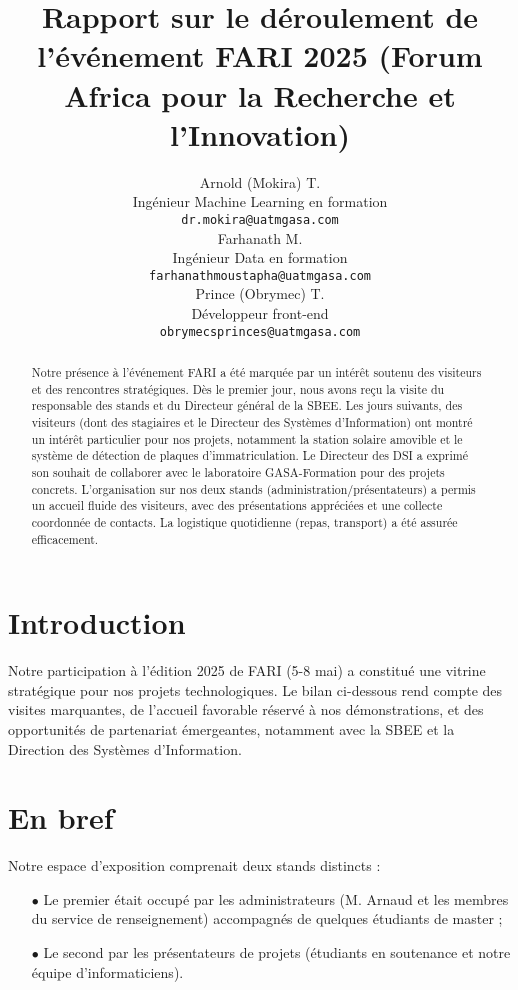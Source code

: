 \documentclass[12pt, a4paper]{article}
\title{Rapport sur le déroulement de l'événement FARI 2025 (Forum Africa pour la Recherche et l'Innovation)}
\author{
 Arnold (Mokira) T. \\
 Ingénieur Machine Learning en formation \\
  \texttt{dr.mokira@uatmgasa.com} \\
   \And
 Farhanath M. \\
 Ingénieur Data en formation \\
  \texttt{farhanathmoustapha@uatmgasa.com} \\
  \And
 Prince (Obrymec) T. \\
 Développeur front-end \\
  \texttt{obrymecsprinces@uatmgasa.com} \\
}
\begin{document}
\maketitle
\begin{abstract}
Notre présence à l'événement FARI a été marquée par un intérêt soutenu des visiteurs et des rencontres stratégiques. Dès le premier jour, nous avons reçu la visite du responsable des stands et du Directeur général de la SBEE. Les jours suivants, des visiteurs (dont des stagiaires et le Directeur des Systèmes d'Information) ont montré un intérêt particulier pour nos projets, notamment la station solaire amovible et le système de détection de plaques d'immatriculation. Le Directeur des DSI a exprimé son souhait de collaborer avec le laboratoire GASA-Formation pour des projets concrets. L'organisation sur nos deux stands (administration/présentateurs) a permis un accueil fluide des visiteurs, avec des présentations appréciées et une collecte coordonnée de contacts. La logistique quotidienne (repas, transport) a été assurée efficacement.
\end{abstract}




\section{Introduction}
Notre participation à l'édition 2025 de FARI (5-8 mai) a constitué une vitrine stratégique pour nos projets technologiques. Le bilan ci-dessous rend compte des visites marquantes, de l'accueil favorable réservé à nos démonstrations, et des opportunités de partenariat émergeantes, notamment avec la SBEE et la Direction des Systèmes d'Information.

\section{En bref}
Notre espace d'exposition comprenait deux stands distincts :

\begin{itemize}
	\item[$\bullet$] Le premier était occupé par les administrateurs (M. Arnaud et les membres du service de renseignement) accompagnés de quelques étudiants de master ;
	\item[$\bullet$] Le second par les présentateurs de projets (étudiants en soutenance et notre équipe d'informaticiens).
\end{itemize}
\end{document}
